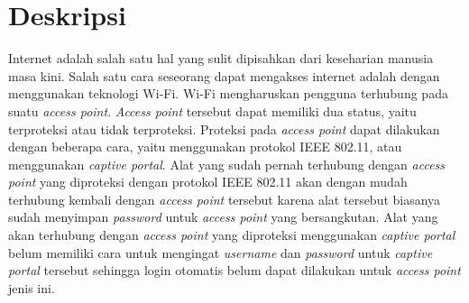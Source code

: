 \documentclass[a4paper,twoside]{article}
\begin{document}
\title{\@judultopik}
\author{\nama \textendash \@npm} 

\newcommand{\nama}{Yohanes Mario Chandra}
\newcommand{\@npm}{2011730031}
\newcommand{\@judultopik}{Wi-Fi Web Auto Login} %
\newcommand{\jumpemb}{1} %
\newcommand{\tanggal}{08/09/2016}


\maketitle


\section{Deskripsi}
%
%
%
%
%

Internet adalah salah satu hal yang sulit dipisahkan dari keseharian manusia masa kini. Salah satu cara seseorang dapat mengakses internet adalah dengan menggunakan teknologi Wi-Fi. Wi-Fi mengharuskan pengguna terhubung pada suatu \textit{access point}. \textit{Access point} tersebut dapat memiliki dua status, yaitu terproteksi atau tidak terproteksi. Proteksi pada \textit{access point} dapat dilakukan dengan beberapa cara, yaitu menggunakan protokol IEEE 802.11, atau menggunakan \textit{captive portal}. Alat yang sudah pernah terhubung dengan \textit{access point} yang diproteksi dengan protokol IEEE 802.11 akan dengan mudah terhubung kembali dengan \textit{access point} tersebut karena alat tersebut biasanya sudah menyimpan \textit{password} untuk \textit{access point} yang bersangkutan. Alat yang akan terhubung dengan \textit{access point} yang diproteksi menggunakan \textit{captive portal} belum memiliki cara untuk mengingat \textit{username} dan \textit{password} untuk \textit{captive portal} tersebut sehingga login otomatis belum dapat dilakukan untuk \textit{access point} jenis ini.
\end{document}

